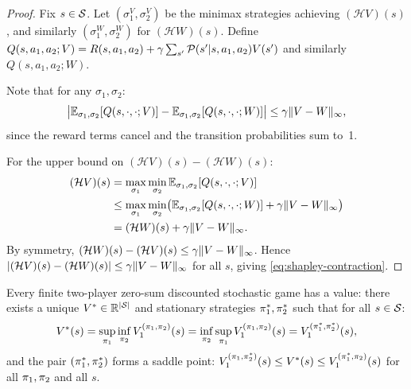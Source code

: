 \documentclass[11pt,a4paper]{article}
\begin{document}
\begin{proof}
Fix $s \in \mathcal{S}$.  Let $(\sigma_1^V, \sigma_2^V)$ be the minimax
strategies achieving $(\mathcal{H} V)(s)$, and similarly
$(\sigma_1^W, \sigma_2^W)$ for $(\mathcal{H} W)(s)$.  Define
$Q(s, a_1, a_2; V) = R(s, a_1, a_2) + \gamma \sum_{s'}
\mathcal{P}(s' | s, a_1, a_2) V(s')$ and similarly $Q(s, a_1, a_2; W)$.

Note that for any $\sigma_1, \sigma_2$:
\begin{equation}
  \bigl|\mathbb{E}_{\sigma_1,\sigma_2}[Q(s,\cdot,\cdot;V)]
  - \mathbb{E}_{\sigma_1,\sigma_2}[Q(s,\cdot,\cdot;W)]\bigr|
  \leq \gamma \|V - W\|_\infty,
\end{equation}
since the reward terms cancel and the transition probabilities sum
to~1.

For the upper bound on $(\mathcal{H}V)(s) - (\mathcal{H}W)(s)$:
\begin{align}
  (\mathcal{H}V)(s)
  &= \max_{\sigma_1} \min_{\sigma_2}
    \mathbb{E}_{\sigma_1,\sigma_2}[Q(s,\cdot,\cdot;V)] \\
  &\leq \max_{\sigma_1} \min_{\sigma_2}
    \bigl(\mathbb{E}_{\sigma_1,\sigma_2}[Q(s,\cdot,\cdot;W)]
    + \gamma \|V - W\|_\infty\bigr) \\
  &= (\mathcal{H}W)(s) + \gamma \|V - W\|_\infty.
\end{align}
By symmetry, $(\mathcal{H}W)(s) - (\mathcal{H}V)(s)
\leq \gamma \|V - W\|_\infty$.  Hence
$|(\mathcal{H}V)(s) - (\mathcal{H}W)(s)|
\leq \gamma \|V - W\|_\infty$ for all $s$, giving
\eqref{eq:shapley-contraction}.
\end{proof}

\begin{theorem}
\label{thm:shapley}
Every finite two-player zero-sum discounted stochastic game has a
value: there exists a unique $V^* \in \mathbb{R}^{|\mathcal{S}|}$ and
stationary strategies $\pi_1^*, \pi_2^*$ such that for all
$s \in \mathcal{S}$:
\begin{equation}
\label{eq:shapley-value}
  V^*(s) = \sup_{\pi_1} \inf_{\pi_2}
    V_1^{(\pi_1, \pi_2)}(s)
  = \inf_{\pi_2} \sup_{\pi_1}
    V_1^{(\pi_1, \pi_2)}(s)
  = V_1^{(\pi_1^*, \pi_2^*)}(s),
\end{equation}
and the pair $(\pi_1^*, \pi_2^*)$ forms a saddle point:
$V_1^{(\pi_1, \pi_2^*)}(s) \leq V^*(s) \leq
V_1^{(\pi_1^*, \pi_2)}(s)$ for all $\pi_1, \pi_2$
and all $s$.
\end{theorem}
\end{document}
